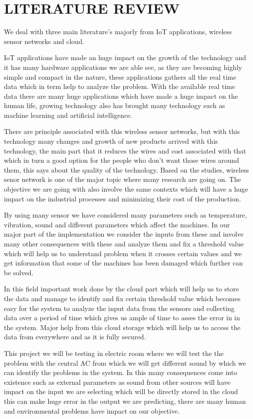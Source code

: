 \section{LITERATURE REVIEW}
We deal with three main literature's majorly from IoT applications, wireless sensor networks and cloud.

IoT applications have made an huge impact on the growth of the technology and it has many hardware applications we are able see, as they are becoming highly simple and compact in the nature, these applications gathers all the real time data which in term help to analyze the problem. With the available real time data there are many huge applications which have made a huge impact on the human life, growing technology also has brought many technology such as machine learning and artificial intelligence.

 There are principle associated with this wireless sensor networks, but with this technology many changes and growth of new products arrived with this technology, the main part that it reduces the wires and cost associated with that which in turn a good option for the people who don't want those wires around them, this says about the quality of the technology. Based on the studies, wireless senor network is one of the major topic where many research are going on.
The objective we are going with also involve the same contexts which will have a huge impact on the industrial processes and minimizing their cost of the production. 

By using many sensor we have considered many parameters such as temperature, vibration, sound and different parameters which affect the machines. In our major part of the implementation we consider the inputs from these and involve many other consequences with these and analyze them and fix a threshold value which will help us to understand problem when it crosses certain values and we get information that some of the machines has been damaged which further can be solved.

In this field important work done by the cloud part which will help us to store the data and manage to identify and fix certain threshold value which becomes easy for the system to analyze the input data from the sensors and collecting data over a period of time which gives us ample of time to asses the error in in the system. Major help from this cloud storage which will help us to access the data from everywhere and as it is fully secured.

This project we will be testing in electric room where we will test the the problem with the central AC from which we will get different sound by which we can identify the problems in the system. 
In this many consequences come into existence such as external parameters as sound from other sources will have impact on the input we are selecting  which will be directly stored in the cloud this can make huge error in the output we are predicting, there are many human and environmental problems have impact on our objective. 

